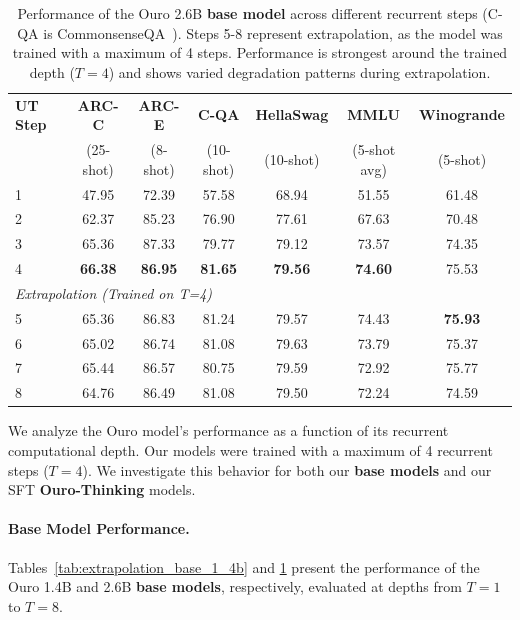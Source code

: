 \documentclass[]{bytedance_seed}
\newcommand{\1}{\mathbf{1}}
\begin{document}
\begin{table}[htbp]
\centering
\small
\caption{Performance of the Ouro 2.6B \textbf{base model} across different recurrent steps (C-QA is CommonsenseQA~\cite{talmor-etal-2019-commonsenseqa}). Steps 5-8 represent extrapolation, as the model was trained with a maximum of 4 steps. Performance is strongest around the trained depth ($T=4$) and shows varied degradation patterns during extrapolation.}
\label{tab:extrapolation_base_2_6b}
\begin{tabular}{lcccccc}
\toprule
\textbf{UT Step} & \textbf{ARC-C} & \textbf{ARC-E} & \textbf{C-QA} & \textbf{HellaSwag} & \textbf{MMLU} & \textbf{Winogrande} \\
& (25-shot) & (8-shot) & (10-shot) & (10-shot) & (5-shot avg) & (5-shot) \\
\midrule
1 & 47.95 & 72.39 & 57.58 & 68.94 & 51.55 & 61.48 \\
2 & 62.37 & 85.23 & 76.90 & 77.61 & 67.63 & 70.48 \\
3 & 65.36 & 87.33 & 79.77 & 79.12 & 73.57 & 74.35 \\
4 & \textbf{66.38} & \textbf{86.95} & \textbf{81.65} & \textbf{79.56} & \textbf{74.60} & 75.53 \\
\midrule[0.8pt]
\multicolumn{7}{l}{\textit{Extrapolation (Trained on T=4)}} \\
\midrule
5 & 65.36 & 86.83 & 81.24 & 79.57 & 74.43 & \textbf{75.93} \\
6 & 65.02 & 86.74 & 81.08 & 79.63 & 73.79 & 75.37 \\
7 & 65.44 & 86.57 & 80.75 & 79.59 & 72.92 & 75.77 \\
8 & 64.76 & 86.49 & 81.08 & 79.50 & 72.24 & 74.59 \\
\bottomrule
\end{tabular}
\end{table}


We analyze the Ouro model's performance as a function of its recurrent computational depth. Our models were trained with a maximum of 4 recurrent steps ($T=4$). We investigate this behavior for both our \textbf{base models} and our SFT \textbf{Ouro-Thinking} models.

\paragraph{Base Model Performance.}
Tables~\ref{tab:extrapolation_base_1_4b} and \ref{tab:extrapolation_base_2_6b} present the performance of the Ouro 1.4B and 2.6B \textbf{base models}, respectively, evaluated at depths from $T=1$ to $T=8$.
\end{document}
